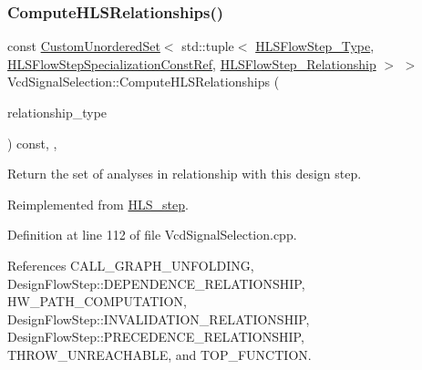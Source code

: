 \subsubsection{\texorpdfstring{Compute\+H\+L\+S\+Relationships()}{ComputeHLSRelationships()}}
{\footnotesize\ttfamily const \hyperlink{classCustomUnorderedSet}{Custom\+Unordered\+Set}$<$ std\+::tuple$<$ \hyperlink{hls__step_8hpp_ada16bc22905016180e26fc7e39537f8d}{H\+L\+S\+Flow\+Step\+\_\+\+Type}, \hyperlink{hls__step_8hpp_a5fdd2edf290c196531d21d68e13f0e74}{H\+L\+S\+Flow\+Step\+Specialization\+Const\+Ref}, \hyperlink{hls__step_8hpp_a3ad360b9b11e6bf0683d5562a0ceb169}{H\+L\+S\+Flow\+Step\+\_\+\+Relationship} $>$ $>$ Vcd\+Signal\+Selection\+::\+Compute\+H\+L\+S\+Relationships (\begin{DoxyParamCaption}\item[{const \hyperlink{classDesignFlowStep_a723a3baf19ff2ceb77bc13e099d0b1b7}{Design\+Flow\+Step\+::\+Relationship\+Type}}]{relationship\+\_\+type }\end{DoxyParamCaption}) const\hspace{0.3cm}{\ttfamily [override]}, {\ttfamily [protected]}, {\ttfamily [virtual]}}



Return the set of analyses in relationship with this design step. 



Reimplemented from \hyperlink{classHLS__step_aed0ce8cca9a1ef18e705fc1032ad4de5}{H\+L\+S\+\_\+step}.



Definition at line 112 of file Vcd\+Signal\+Selection.\+cpp.



References C\+A\+L\+L\+\_\+\+G\+R\+A\+P\+H\+\_\+\+U\+N\+F\+O\+L\+D\+I\+NG, Design\+Flow\+Step\+::\+D\+E\+P\+E\+N\+D\+E\+N\+C\+E\+\_\+\+R\+E\+L\+A\+T\+I\+O\+N\+S\+H\+IP, H\+W\+\_\+\+P\+A\+T\+H\+\_\+\+C\+O\+M\+P\+U\+T\+A\+T\+I\+ON, Design\+Flow\+Step\+::\+I\+N\+V\+A\+L\+I\+D\+A\+T\+I\+O\+N\+\_\+\+R\+E\+L\+A\+T\+I\+O\+N\+S\+H\+IP, Design\+Flow\+Step\+::\+P\+R\+E\+C\+E\+D\+E\+N\+C\+E\+\_\+\+R\+E\+L\+A\+T\+I\+O\+N\+S\+H\+IP, T\+H\+R\+O\+W\+\_\+\+U\+N\+R\+E\+A\+C\+H\+A\+B\+LE, and T\+O\+P\+\_\+\+F\+U\+N\+C\+T\+I\+ON.

\mbox{\label{classVcdSignalSelection_a7b1ff93c5a9469c61e0558047f601dc5}} 
